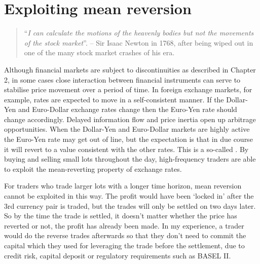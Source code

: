 \chapter{Exploiting mean reversion}\label{chap:jumps}

\begin{quotation}\noindent ``\emph{I can calculate the motions of the heavenly bodies but not the movements of the stock market}''. -- Sir Isaac Newton in 1768, after being wiped out in one of the many stock market crashes of his era.
\end{quotation}

Although financial markets are subject to discontinuities as described in Chapter 2, in some cases close interaction between financial instruments can serve to stabilise price movement over a period of time. In foreign exchange markets, for example, rates are expected to move in a self-consistent manner. If the Dollar-Yen and Euro-Dollar exchange rates change then the Euro-Yen rate should change accordingly. Delayed information flow and price inertia open up arbitrage opportunities. When the Dollar-Yen and Euro-Dollar markets are highly active the Euro-Yen rate may get out of line, but the expectation is that in due course it will revert to a value consistent with the other rates. This is a so-called . By buying and selling small lots throughout the day, high-frequency traders are able to exploit the mean-reverting property of exchange rates. 

For traders who trade larger lots with a longer time horizon, mean reversion cannot be exploited in this way. The profit would have been `locked in' after the 3rd currency pair is traded, but the trades will only be settled on two days later. So by the time the trade is settled, it doesn't matter whether the price has reverted or not, the profit has already been made. In my experience, a trader would do the reverse trades afterwards so that they don't need to commit the capital which they used for leveraging the trade before the settlement, due to credit risk, capital deposit or regulatory requirements such as BASEL II.


